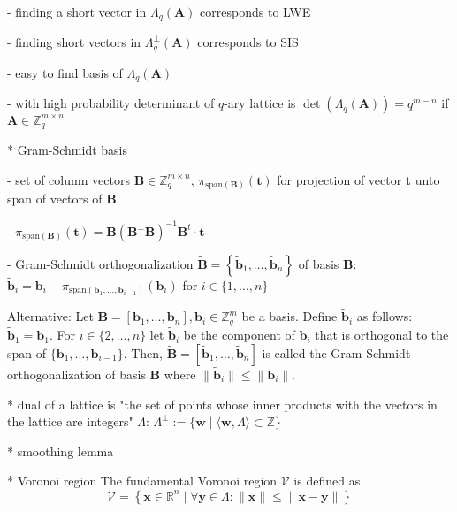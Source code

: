 \documentclass[
  a4paper,  %
  twoside,  %
  bibliography=totoc,
  headsepline,
  cleardoublepage=empty,
  parskip=half,
  draft=false
]{scrbook}
\begin{document}
    - finding a short vector in $\Lambda_q(\textbf{A})$ corresponds to LWE %

    - finding short vectors in $\Lambda_q^\perp(\textbf{A})$ corresponds to SIS %

    - easy to find basis of $\Lambda_q(\textbf{A})$ \cite{AFG13}

    - with high probability determinant of $q$-ary lattice is $\det(\Lambda_q(\textbf{A}))=q^{m-n}$ if $\textbf{A} \in \mathbb{Z}_q^{m\times n}$


  * Gram-Schmidt basis

    - set of column vectors $\textbf{B} \in \mathbb{Z}_q^{m\times n}$, $\pi_{\text{span}(\textbf{B})}(\textbf{t})$ for projection of vector $\textbf{t}$ unto span of vectors of $\textbf{B}$

    - $\pi_{\text{span}(\textbf{B})}(\textbf{t}) = \textbf{B}(\textbf{B}^\perp \textbf{B})^{-1}\textbf{B}^t \cdot \textbf{t}$

    - Gram-Schmidt orthogonalization $\tilde{\textbf{B}} = \left\{\tilde{\textbf{b}}_1, \ldots, \tilde{\textbf{b}}_n\right\}$ of basis $\textbf{B}$: $\tilde{\textbf{b}}_i = \textbf{b}_i - \pi_{\text{span}(\textbf{b}_1, \ldots, \textbf{b}_{i-1})}(\textbf{b}_i)$ for $i \in \{1, \ldots, n\}$ 

    Alternative:
    Let $\textbf{B} = \left[\textbf{b}_1, \ldots, \textbf{b}_n\right], \textbf{b}_i \in \mathbb{Z}_q^{m}$ be a basis. Define $\tilde{\textbf{b}}_i$ as follows: $\tilde{\textbf{b}}_1 = \textbf{b}_1$. For $i \in \{2, \ldots, n\}$ let $\tilde{\textbf{b}}_i$ be the component of $\textbf{b}_i$ that is orthogonal to the span of $\{\textbf{b}_1, \ldots, \textbf{b}_{i-1}\}$. Then,  $\tilde{\textbf{B}} = \left[\tilde{\textbf{b}}_1, \ldots, \tilde{\textbf{b}}_n\right]$ is called the Gram-Schmidt orthogonalization of basis $\textbf{B}$ where $\| \tilde{\textbf{b}}_i\| \leq \| \textbf{b}_i\|$. 

  
  * dual of a lattice is "the set of points whose inner products with the vectors in the lattice are integers" $\Lambda$: $\Lambda^{\perp} := \{ \textbf{w} \mid \langle \textbf{w}, \Lambda \rangle \subset \mathbb{Z}\}$
    
  * smoothing lemma

  * Voronoi region %
  The fundamental Voronoi region $\mathcal{V}$ is defined as 
  \begin{equation}
    \mathcal{V} = \left\{ \textbf{x} \in \mathbb{R}^n \mid \forall \textbf{y} \in \Lambda : \| \textbf{x} \| \leq \| \textbf{x} - \textbf{y} \| \right\}
  \end{equation}
\end{document}
